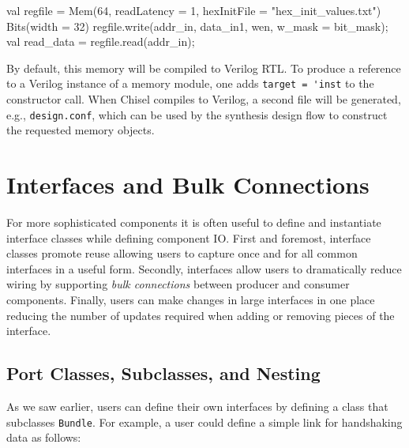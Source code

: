 \documentclass[10pt]{article}
\begin{document}
\begin{scala}
  val regfile =
    Mem(64, readLatency = 1, 
        hexInitFile = "hex_init_values.txt"){ Bits(width = 32) }
  regfile.write(addr_in, data_in1, wen, w_mask = bit_mask);
  val read_data = regfile.read(addr_in);
\end{scala}


% 
% 
By default, this memory will be compiled to Verilog RTL.  To produce a
reference to a Verilog instance of a memory module, one adds
\verb+target = 'inst+ to the constructor call.  When Chisel compiles
to Verilog, a second file will be generated, e.g., \verb+design.conf+,
which can be used by the synthesis design flow to construct the
requested memory objects.

\section{Interfaces and Bulk Connections}
\label{sec:interfaces}

For more sophisticated components it is often useful to define and
instantiate interface classes while defining component IO.  First and
foremost, interface classes promote reuse allowing users to capture
once and for all common interfaces in a useful form.  Secondly,
interfaces allow users to dramatically reduce wiring by supporting
{\em bulk connections} between producer and consumer components.  Finally,
users can make changes in large interfaces in one place reducing the
number of updates required when adding or removing pieces of the
interface.

\subsection{Port Classes, Subclasses, and Nesting}

As we saw earlier, users can define their own interfaces by defining a class that subclasses \verb+Bundle+.  
For example, a user could define a simple link for handshaking data as follows:
\end{document}
